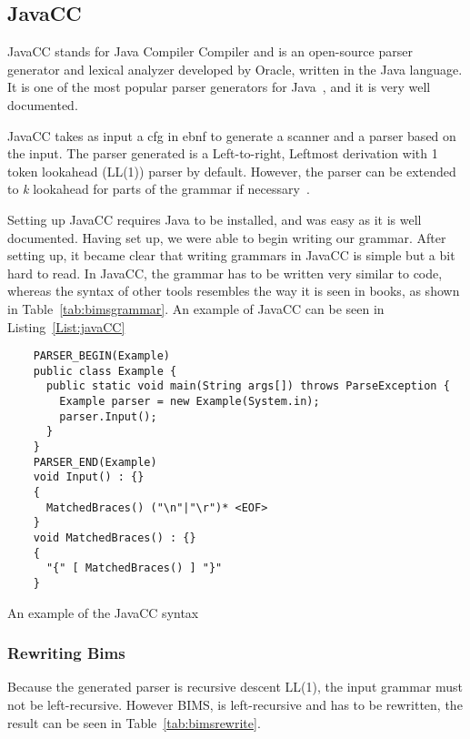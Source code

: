 \subsection{JavaCC}
JavaCC stands for Java Compiler Compiler and is an open-source parser generator and lexical analyzer developed by Oracle, written in the Java language. It is one of the most popular parser generators for Java~\cite{JavaCC2021}, and it is very well documented.

JavaCC takes as input a \gls{cfg} in \gls{ebnf} to generate a scanner and a parser based on the input. The parser generated is a Left-to-right, Leftmost derivation with 1 token lookahead (LL(1)) parser by default. However, the parser can be extended to \textit{k} lookahead for parts of the grammar if necessary~\cite{JavaCC2021}.

Setting up JavaCC requires Java to be installed, and was easy as it is well documented. Having set up, we were able to begin writing our grammar. After setting up, it became clear that writing grammars in JavaCC is simple but a bit hard to read. In JavaCC, the grammar has to be written very similar to code, whereas the syntax of other tools resembles the way it is seen in books, as shown in Table~\ref{tab:bimsgrammar}. An example of JavaCC can be seen in Listing~\ref{List:javaCC}


\begin{listing}[htb!]
  \centering
  \begin{verbatim}
    PARSER_BEGIN(Example)
    public class Example {
      public static void main(String args[]) throws ParseException {
        Example parser = new Example(System.in);
        parser.Input();
      }
    }
    PARSER_END(Example)
    void Input() : {}
    {
      MatchedBraces() ("\n"|"\r")* <EOF>
    }
    void MatchedBraces() : {}
    {
      "{" [ MatchedBraces() ] "}"
    }
\end{verbatim}
  \caption{An example of the JavaCC syntax}
  \label{List:javaCC}
\end{listing}


\subsubsection{Rewriting Bims}
Because the generated parser is recursive descent LL(1), the input grammar must not be left-recursive. However BIMS, is left-recursive and has to be rewritten, the result can be seen in Table~\ref{tab:bimsrewrite}.


